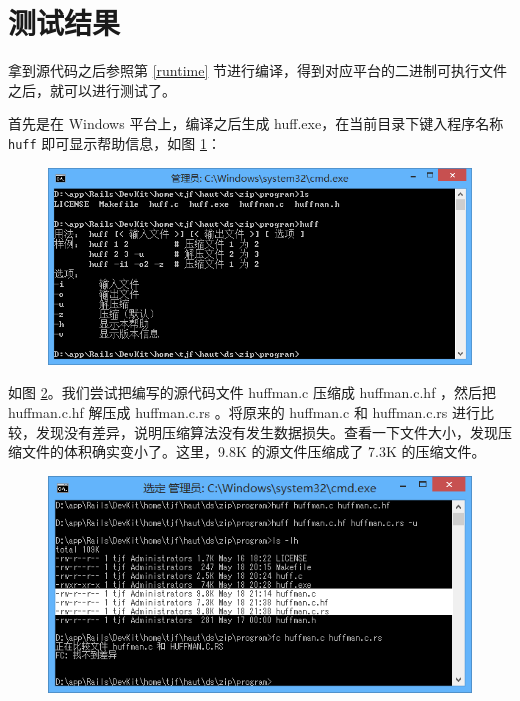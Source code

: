 \section{测试结果}

拿到源代码之后参照第 \ref{runtime} 节进行编译，得到对应平台的二进制可执行文件之后，就可以进行测试了。

首先是在 Windows 平台上，编译之后生成 {\sf huff.exe}，在当前目录下键入程序名称 \verb|huff| 即可显示帮助信息，如图 \ref{win_huff}：

\begin{figure}[htp]
\includegraphics[width=\textwidth]{image/win_huff.png}
\caption{\label{win_huff}}
\end{figure}

如图 \ref{win_test}。我们尝试把编写的源代码文件 {\sf huffman.c} 压缩成 {\sf huffman.c.hf} ，然后把 {\sf huffman.c.hf} 解压成 {\sf huffman.c.rs} 。将原来的 {\sf huffman.c} 和 {\sf huffman.c.rs} 进行比较，发现没有差异，说明压缩算法没有发生数据损失。查看一下文件大小，发现压缩文件的体积确实变小了。这里，9.8K 的源文件压缩成了 7.3K 的压缩文件。

\begin{figure}[htp]
\includegraphics[width=\textwidth]{image/win_test.png}
\caption{\label{win_test}}
\end{figure}

